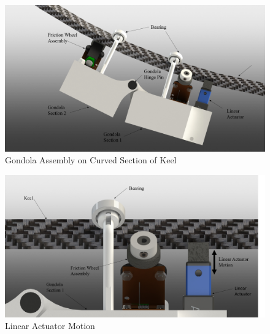 \documentclass[../main.tex]{subfiles}
\begin{document}
\begin{figure}[H]
	\centering
	\includegraphics[width=.8\linewidth]{img/design/gondola/gondolaBent.png}
	\caption{Gondola Assembly on Curved Section of Keel}
	\label{fig:gondolaBent}
\end{figure}

\begin{figure}[H]
	\centering
	\includegraphics[width=.8\linewidth]{img/design/gondola/linearActuatorAndMotor.png}
	\caption{Linear Actuator Motion}
	\label{fig:linearActuatorAndMotor}
\end{figure}
\end{document}
